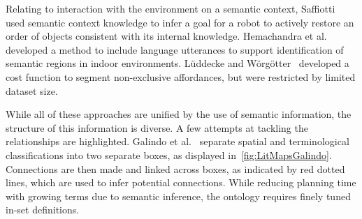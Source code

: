 \documentclass[a4paper,12pt]{article}
\theoremstyle{mytheor}
\begin{document}
Relating to interaction with the environment on a semantic context, Saffiotti~\cite{saffiotti_robots_2011} used semantic context knowledge to infer a goal for a robot to actively restore an order of objects consistent with its internal knowledge. Hemachandra et al.~\cite{hemachandra_learning_2014} developed a method to include language utterances to support identification of semantic regions in indoor environments. Lüddecke and Wörgötter~\cite{luddecke_learning_2017} developed a cost function to segment non-exclusive affordances, but were restricted by limited dataset size.

While all of these approaches are unified by the use of semantic information, the structure of this information is diverse. A few attempts at tackling the relationships are highlighted.
Galindo et al.~\cite{galindo_robot_2008} separate spatial and terminological classifications into two separate boxes, as displayed in~\ref{fig:LitMapsGalindo}. Connections are then made and linked across boxes, as indicated by red dotted lines, which are used to infer potential connections. While reducing planning time with growing terms due to semantic inference, the ontology requires finely tuned in-set definitions.\\
\end{document}
